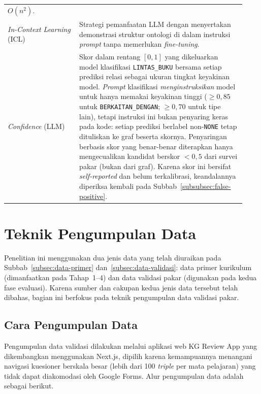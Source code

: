 \documentclass[../../thesis]{subfiles}
\begin{document}
\begin{table}[htbp]
\begin{tabular}{@{}p{0.28\linewidth}p{0.65\linewidth}@{}}
      $O(n^2)$. \\
  \textit{In-Context Learning} (ICL)
    & Strategi pemanfaatan LLM dengan menyertakan demonstrasi struktur
      ontologi di dalam instruksi \textit{prompt} tanpa memerlukan
      \textit{fine-tuning}. \\
  \textit{Confidence} (LLM)
    & Skor dalam rentang $[0,1]$ yang dikeluarkan model klasifikasi
      \texttt{LINTAS\_BUKU} bersama setiap prediksi relasi sebagai ukuran
      tingkat keyakinan model. \textit{Prompt} klasifikasi
      \emph{menginstruksikan} model untuk hanya memakai keyakinan tinggi
      ($\geq 0{,}85$ untuk \texttt{BERKAITAN\_DENGAN}; $\geq 0{,}70$ untuk
      tipe lain), tetapi instruksi ini bukan penyaring keras pada kode:
      setiap prediksi berlabel non-\texttt{NONE} tetap dituliskan ke graf
      beserta skornya. Penyaringan berbasis skor yang benar-benar diterapkan
      hanya mengecualikan kandidat berskor $< 0{,}5$ dari survei pakar (bukan
      dari graf). Karena skor ini bersifat \textit{self-reported} dan belum
      terkalibrasi, keandalannya diperiksa kembali pada
      Subbab~\ref{subsubsec:false-positive}. \\
\end{tabular}
\end{table}

\section{Teknik Pengumpulan Data}

Penelitian ini menggunakan dua jenis data yang telah diuraikan pada
Subbab~\ref{subsec:data-primer} dan~\ref{subsec:data-validasi}: data primer
kurikulum (dimanfaatkan pada Tahap~1--4) dan data validasi pakar (digunakan
pada kedua fase evaluasi). Karena sumber dan cakupan kedua jenis data tersebut
telah dibahas, bagian ini berfokus pada teknik pengumpulan data validasi pakar.

\subsection{Cara Pengumpulan Data}\label{subsec:cara-pengumpulan}

Pengumpulan data validasi dilakukan melalui aplikasi web KG Review App
yang dikembangkan menggunakan Next.js, dipilih karena kemampuannya
menangani navigasi kuesioner berskala besar (lebih dari 100
\textit{triple} per mata pelajaran) yang tidak dapat diakomodasi oleh
Google Forms. Alur pengumpulan data adalah sebagai berikut.
\end{document}
